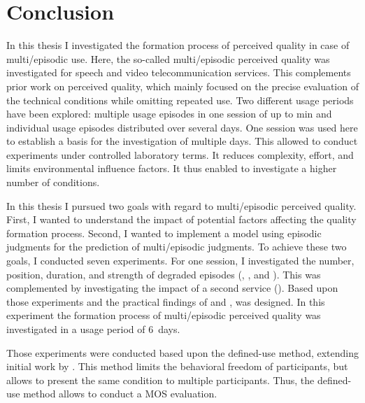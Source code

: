 \chapter{Conclusion}\label{chap:discussion}
In this thesis I investigated the formation process of perceived quality in case of multi\-/episodic use.
Here, the so-called multi\-/episodic perceived quality was investigated for speech and video telecommunication services.
This complements prior work on perceived quality, which mainly focused on the precise evaluation of the technical conditions while omitting repeated use.
Two different usage periods have been explored: multiple usage episodes in one session of up to \unit[45]{min} and individual usage episodes distributed over several days.
One session was used here to establish a basis for the investigation of multiple days.
This allowed to conduct experiments under controlled laboratory terms.
It reduces complexity, effort, and limits environmental influence factors.
It thus enabled to investigate a higher number of conditions.

In this thesis I pursued two goals with regard to multi\-/episodic perceived quality.
First, I wanted to understand the impact of potential factors affecting the quality formation process.
Second, I wanted to implement a model using episodic judgments for the prediction of multi\-/episodic judgments.
To achieve these two goals, I conducted seven experiments.
For one session, I investigated the number, position, duration, and strength of degraded episodes (, \EIIa{}, and ).
This was complemented by investigating the impact of a second service (\EIIb{}).
Based upon those experiments and the practical findings of  and ,  was designed.
In this experiment the formation process of multi\-/episodic perceived quality was investigated in a usage period of 6~days.

Those experiments were conducted based upon the defined-use method, extending initial work by \citet{moller_single-call_2011}.
This method limits the behavioral freedom of participants, but allows to present the same condition to multiple participants.
Thus, the defined-use method allows to conduct a \ac{MOS} evaluation.

